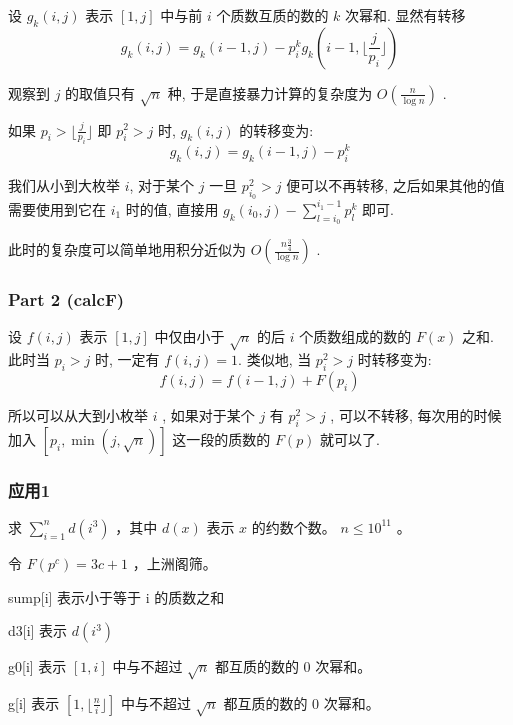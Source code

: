 \documentclass{article}
\begin{document}
设 $g_k(i,j)$ 表示 $[1,j]$ 中与前 $i$ 个质数互质的数的 $k$ 次幂和. 显然有转移
$$g_k(i, j) = g_k(i - 1, j) - p_i^k g_k(i - 1, \lfloor \frac{j}{p_i} \rfloor)$$

观察到 $j$ 的取值只有 $\sqrt{n}$ 种, 于是直接暴力计算的复杂度为 $O(\frac{n}{\log n})$ .

如果 $p_i > \lfloor \frac{j}{p_i} \rfloor$ 即 $p_i^2 > j$ 时, $g_k(i,j)$ 的转移变为:
$$g_k(i, j) = g_k(i - 1, j) - p_i^k$$

我们从小到大枚举 $i$, 对于某个 $j$ 一旦 $p_{i_0}^2 > j$ 便可以不再转移, 之后如果其他的值需要使用到它在 $i_1$ 时的值, 直接用 $g_k(i_0, j) - \sum_{l = i_0}^{i_1 - 1} p_l^k$ 即可. 

此时的复杂度可以简单地用积分近似为 $O(\frac{n\frac{3}{4}}{\log n})$ .

\subsubsection*{Part 2 (calcF)}

设 $f(i,j)$ 表示 $[1,j]$ 中仅由小于 $\sqrt{n}$ 的后 $i$ 个质数组成的数的 $F(x)$ 之和. 此时当 $p_i > j$ 时, 一定有 $f(i,j)=1$. 类似地, 当 $p_i^2>j$ 时转移变为:
$$f(i, j) = f(i - 1, j) + F(p_i)$$

所以可以从大到小枚举 $i$ , 如果对于某个 $j$ 有 $p_i^2>j$ , 可以不转移, 每次用的时候加入 $[p_i, \min(j, \sqrt{n})]$ 这一段的质数的 $F(p)$ 就可以了.

\subsubsection*{应用1}

求 $\sum\limits_{i=1}^{n} d(i^3)$ ，其中 $d(x)$ 表示 $x$ 的约数个数。 $n \leq 10^{11}$ 。

令 $F(p^c) = 3c + 1$ ，上洲阁筛。

sump[i] 表示小于等于 i 的质数之和

d3[i] 表示 $d(i^3)$

g0[i] 表示 $[1, i]$ 中与不超过 $\sqrt{n}$ 都互质的数的 $0$ 次幂和。

g[i] 表示 $[1, \lfloor \frac{n}{i} \rfloor ]$ 中与不超过 $\sqrt{n}$ 都互质的数的 $0$ 次幂和。
\end{document}
